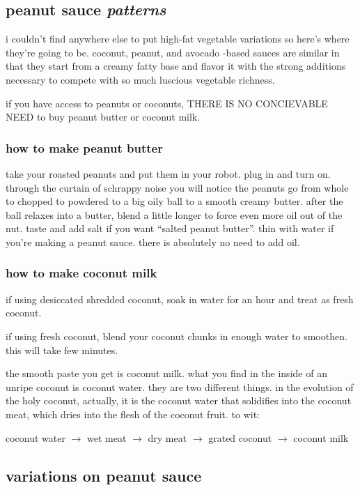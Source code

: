 \subsection{peanut sauce \textit{patterns}}

i couldn't find anywhere else to put high-fat vegetable variations so here's 
where they're going to be. coconut, peanut, and avocado -based sauces are 
similar in that they start from a creamy fatty base and flavor it with the 
strong additions necessary to compete with so much luscious vegetable richness.

if you have access to peanuts or coconuts, THERE IS NO CONCIEVABLE NEED to buy 
peanut butter or coconut milk.

\subsubsection{how to make peanut butter}

take your roasted peanuts and put them in your robot. plug in and turn on.
through the curtain of schrappy noise you will notice the peanuts go from 
whole to chopped to powdered to a big oily ball to a smooth creamy butter. 
after the ball relaxes into a butter, blend a little longer to force even 
more oil out of the nut. taste and add salt if you want ``salted peanut 
butter''. thin with water if you're making a peanut sauce. there is absolutely 
no need to add oil.

\subsubsection{how to make coconut milk}

if using desiccated shredded coconut, soak in water for an hour and treat as 
fresh coconut.

if using fresh coconut, blend your coconut chunks in enough water to smoothen. 
this will take few minutes.

the smooth paste you get is coconut milk. what you find in the inside of an 
unripe coconut is coconut water. they are two different things. in the 
evolution of the holy coconut, actually, it is the coconut water that 
solidifies into the coconut meat, which dries into the flesh of the coconut 
fruit. to wit:

\textsf{coconut water $\rightarrow$ wet meat $\rightarrow$ dry meat 
$\rightarrow$ grated coconut $\rightarrow$ coconut milk}

\subsection{variations on peanut sauce}

